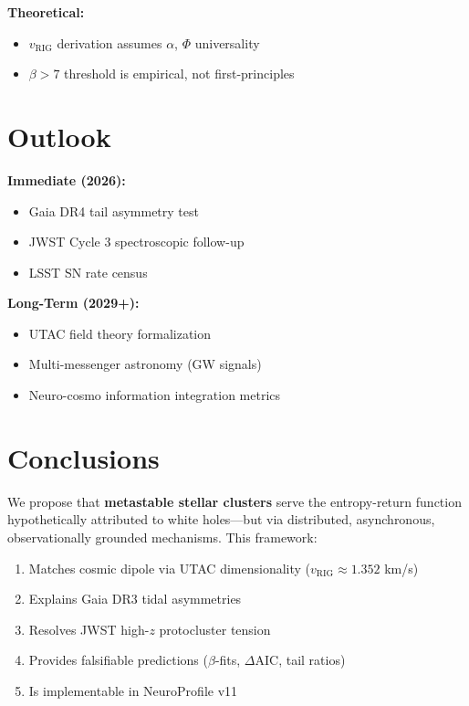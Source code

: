 \documentclass[11pt,a4paper,twocolumn]{article}
\begin{document}
\textbf{Theoretical:}
\begin{itemize}
    \item $v_{\text{RIG}}$ derivation assumes $\alpha$, $\Phi$ universality
    \item $\beta > 7$ threshold is empirical, not first-principles
\end{itemize}

\section{Outlook}

\textbf{Immediate (2026):}
\begin{itemize}
    \item Gaia DR4 tail asymmetry test
    \item JWST Cycle 3 spectroscopic follow-up
    \item LSST SN rate census
\end{itemize}

\textbf{Long-Term (2029+):}
\begin{itemize}
    \item UTAC field theory formalization
    \item Multi-messenger astronomy (GW signals)
    \item Neuro-cosmo information integration metrics
\end{itemize}

\section{Conclusions}

We propose that \textbf{metastable stellar clusters} serve the entropy-return function hypothetically attributed to white holes---but via distributed, asynchronous, observationally grounded mechanisms. This framework:

\begin{enumerate}
    \item Matches cosmic dipole via UTAC dimensionality ($v_{\text{RIG}} \approx 1.352$ km/s)
    \item Explains Gaia DR3 tidal asymmetries
    \item Resolves JWST high-$z$ protocluster tension
    \item Provides falsifiable predictions ($\beta$-fits, $\Delta$AIC, tail ratios)
    \item Is implementable in NeuroProfile v11
\end{enumerate}
\end{document}
